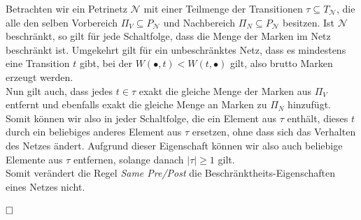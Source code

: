 \documentclass[12pt,a4paper]{../krautsourcing/homework}
\begin{document}
Betrachten wir ein Petrinetz \(\mathcal{N}\) mit einer Teilmenge der Transitionen \(\tau \subseteq T_\mathcal{N}\), die alle den selben Vorbereich \(\Pi_V \subseteq P_\mathcal{N}\) und Nachbereich \(\Pi_N \subseteq P_{\mathcal{N}}\) besitzen. Ist \(\mathcal{N}\) beschränkt, so gilt für jede Schaltfolge, dass die Menge der Marken im Netz beschränkt ist. Umgekehrt gilt für ein unbeschränktes Netz, dass es mindestens eine Transition \(t\) gibt, bei der \(W(\bullet,t) < W(t,\bullet)\) gilt, also brutto Marken erzeugt werden. \\
Nun gilt auch, dass jedes \(t \in \tau\) exakt die gleiche Menge der Marken aus \(\Pi_V\) entfernt und ebenfalls exakt die gleiche Menge an Marken zu \(\Pi_N\) hinzufügt. Somit können wir also in jeder Schaltfolge, die ein Element aus \(\tau\) enthält, dieses \(t\) durch ein beliebiges anderes Element aus \(\tau\) ersetzen, ohne dass sich das Verhalten des Netzes ändert. Aufgrund dieser Eigenschaft können wir also auch beliebige Elemente aus \(\tau\) entfernen, solange danach \(|\tau| \geq 1\) gilt.\\
Somit verändert die Regel \textit{Same Pre/Post} die Beschränktheits-Eigenschaften eines Netzes nicht.

\(\hfill \square\)
\end{document}

